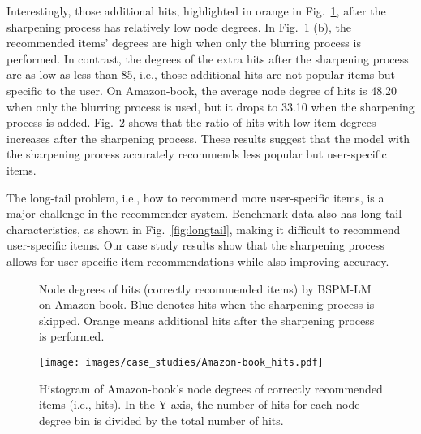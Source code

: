 \documentclass[sigconf,natbib=true]{acmart}
\begin{document}
Interestingly, those additional hits, highlighted in orange in Fig.~\ref{fig:case_study}, after the sharpening process has relatively low node degrees. In Fig.~\ref{fig:case_study} (b), the recommended items' degrees are high when only the blurring process is performed. In contrast, the degrees of the extra hits after the sharpening process are as low as less than 85, i.e., those additional hits are not popular items but specific to the user. On Amazon-book, the average node degree of hits is 48.20 when only the blurring process is used, but it drops to 33.10 when the sharpening process is added. Fig.~\ref{fig:case_study_all} shows that the ratio of hits with low item degrees increases after the sharpening process. These results suggest that the model with the sharpening process accurately recommends less popular but user-specific items.

The long-tail problem, i.e., how to recommend more user-specific items, is a major challenge in the recommender system. Benchmark data also has long-tail characteristics, as shown in Fig.~\ref{fig:longtail}, making it difficult to recommend user-specific items. Our case study results show that the sharpening process allows for user-specific item recommendations while also improving accuracy.

\begin{figure}[t]
    \centering
{}
    \caption{Node degrees of hits (correctly recommended items) by BSPM-LM on Amazon-book. Blue denotes hits when the sharpening process is skipped. Orange means additional hits after the sharpening process is performed.}
\label{fig:case_study}
\end{figure}

\begin{figure}[t]
    \centering
\texttt{[image: images/case\_studies/Amazon-book\_hits.pdf]}
    \caption{Histogram of Amazon-book's node degrees of correctly recommended items (i.e., hits). In the Y-axis, the number of hits for each node degree bin is divided by the total number of hits.}
\label{fig:case_study_all}
\end{figure}
\end{document}
